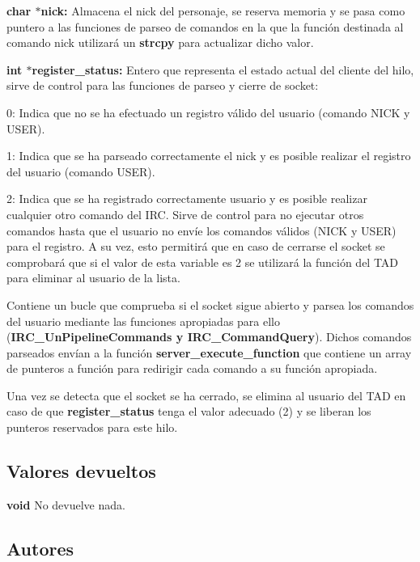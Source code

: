\begin{DoxyItemize}
\item {\bfseries char $\ast$nick\+:} Almacena el nick del personaje, se reserva memoria y se pasa como puntero a las funciones de parseo de comandos en la que la función destinada al comando nick utilizará un {\bfseries strcpy} para actualizar dicho valor. 
\item {\bfseries int $\ast$register\+\_\+status\+:} Entero que representa el estado actual del cliente del hilo, sirve de control para las funciones de parseo y cierre de socket\+: 
\begin{DoxyItemize}
\item 0\+: Indica que no se ha efectuado un registro válido del usuario (comando N\+I\+C\+K y U\+S\+E\+R). 
\item 1\+: Indica que se ha parseado correctamente el nick y es posible realizar el registro del usuario (comando U\+S\+E\+R). 
\item 2\+: Indica que se ha registrado correctamente usuario y es posible realizar cualquier otro comando del I\+R\+C. Sirve de control para no ejecutar otros comandos hasta que el usuario no envíe los comandos válidos (N\+I\+C\+K y U\+S\+E\+R) para el registro. A su vez, esto permitirá que en caso de cerrarse el socket se comprobará que si el valor de esta variable es 2 se utilizará la función del T\+A\+D para eliminar al usuario de la lista. 
\end{DoxyItemize}
\end{DoxyItemize}

Contiene un bucle que comprueba si el socket sigue abierto y parsea los comandos del usuario mediante las funciones apropiadas para ello ({\bfseries I\+R\+C\+\_\+\+Un\+Pipeline\+Commands y I\+R\+C\+\_\+\+Command\+Query}). Dichos comandos parseados envían a la función {\bfseries server\+\_\+execute\+\_\+function} que contiene un array de punteros a función para redirigir cada comando a su función apropiada.

Una vez se detecta que el socket se ha cerrado, se elimina al usuario del T\+A\+D en caso de que {\bfseries register\+\_\+status} tenga el valor adecuado (2) y se liberan los punteros reservados para este hilo.\hypertarget{server_start_communication_return4}{}\subsection{Valores devueltos}\label{server_start_communication_return4}

\begin{DoxyItemize}
\item {\bfseries void} No devuelve nada. 
\end{DoxyItemize}\hypertarget{server_start_communication_authors4}{}\subsection{Autores}\label{server_start_communication_authors4}

